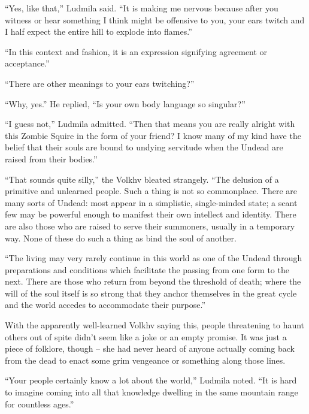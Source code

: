  

“Yes, like that,” Ludmila said. “It is making me nervous because after you witness or hear something I think might be offensive to you, your ears twitch and I half expect the entire hill to explode into flames.”

 

“In this context and fashion, it is an expression signifying agreement or acceptance.”

 

“There are other meanings to your ears twitching?”

 

“Why, yes.” He replied, “Is your own body language so singular?”

 

“I guess not,” Ludmila admitted. “Then that means you are really alright with this Zombie Squire in the form of your friend? I know many of my kind have the belief that their souls are bound to undying servitude when the Undead are raised from their bodies.”

 

“That sounds quite silly,” the Volkhv bleated strangely. “The delusion of a primitive and unlearned people. Such a thing is not so commonplace. There are many sorts of Undead: most appear in a simplistic, single-minded state; a scant few may be powerful enough to manifest their own intellect and identity. There are also those who are raised to serve their summoners, usually in a temporary way. None of these do such a thing as bind the soul of another.

 

“The living may very rarely continue in this world as one of the Undead through preparations and conditions which facilitate the passing from one form to the next. There are those who return from beyond the threshold of death; where the will of the soul itself is so strong that they anchor themselves in the great cycle and the world accedes to accommodate their purpose.”

 

With the apparently well-learned Volkhv saying this, people threatening to haunt others out of spite didn’t seem like a joke or an empty promise. It was just a piece of folklore, though – she had never heard of anyone actually coming back from the dead to enact some grim vengeance or something along those lines.

 

“Your people certainly know a lot about the world,” Ludmila noted. “It is hard to imagine coming into all that knowledge dwelling in the same mountain range for countless ages.”

